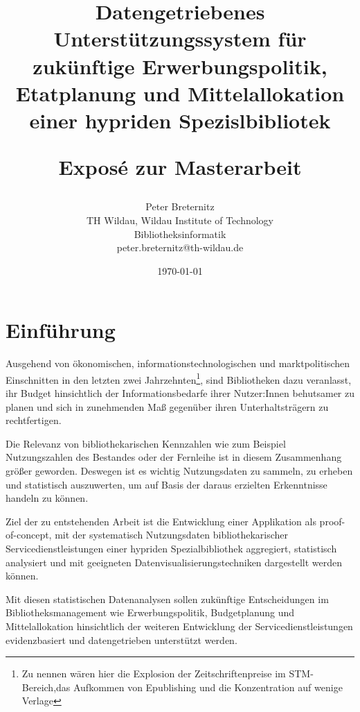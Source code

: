\documentclass[10pt,a4paper,twocolumn,conference]{IEEEtran}
\begin{document}
\nocite{*}
\title{{\bf Datengetriebenes Unterstützungssystem für zukünftige
        Erwerbungspolitik, Etatplanung und Mittelallokation einer hypriden
        Spezislbibliotek} \\ 
    \begin{large}
        Exposé zur Masterarbeit                                                                             
    \end{large}}
\author{
	Peter Breternitz \\
	TH Wildau, Wildau Institute of Technology\\ Bibliotheksinformatik \\
	peter.breternitz@th-wildau.de
}


\date{\today}

\maketitle

\section{Einführung}
Ausgehend von ökonomischen, informationstechnologischen und marktpolitischen Einschnitten in den
letzten zwei Jahrzehnten\footnote{Zu nennen wären hier die Explosion der Zeitschriftenpreise im 
STM-Bereich,das Aufkommen von Epublishing und die Konzentration auf wenige Verlage}, 
sind Bibliotheken dazu veranlasst, ihr Budget hinsichtlich der Informationsbedarfe
ihrer Nutzer:Innen behutsamer zu planen und sich in zunehmenden Maß gegenüber ihren Unterhaltsträgern zu rechtfertigen.

Die Relevanz von bibliothekarischen Kennzahlen wie zum Beispiel Nutzungszahlen 
des Bestandes oder der Fernleihe ist in diesem Zusammenhang größer geworden.
Deswegen ist es wichtig Nutzungsdaten zu sammeln, zu erheben und statistisch
auszuwerten, um auf Basis der daraus erzielten Erkenntnisse handeln zu können.

Ziel der zu entstehenden Arbeit ist die Entwicklung einer Applikation als proof-of-concept,
mit der systematisch Nutzungsdaten bibliothekarischer Servicedienstleistungen einer
hypriden Spezialbibliothek aggregiert, statistisch
analysiert und mit geeigneten Datenvisualisierungstechniken dargestellt werden können. 

Mit diesen statistischen Datenanalysen sollen zukünftige
Entscheidungen im Bibliotheksmanagement wie Erwerbungspolitik, Budgetplanung und 
Mittelallokation hinsichtlich der weiteren Entwicklung der 
Servicedienstleistungen evidenzbasiert und datengetrieben unterstützt werden. 
\end{document}
